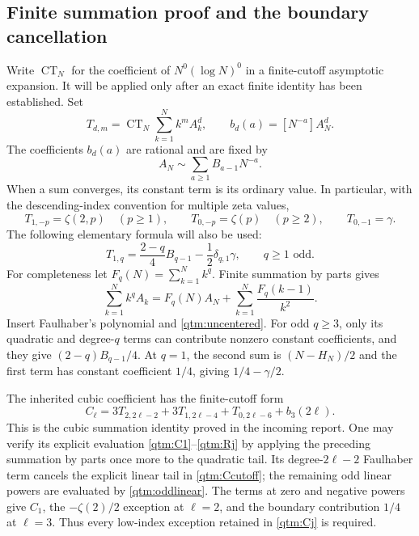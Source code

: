 \documentclass[11pt,a4paper]{article}
\numberwithin{equation}{section}
\theoremstyle{plain}
\theoremstyle{definition}
\theoremstyle{remark}
\begin{document}
\subsection{Finite summation proof and the boundary cancellation}

Write $\operatorname{CT}_N$ for the coefficient of
$N^0(\log N)^0$ in a finite-cutoff asymptotic expansion.  It will be
applied only after an exact finite identity has been established.
Set
\begin{equation}\label{qtm:T}
 T_{d,m}=\operatorname{CT}_N\sum_{k=1}^Nk^m A_k^d,
 \qquad b_d(a)=[N^{-a}]A_N^d.
\end{equation}
The coefficients $b_d(a)$ are rational and are fixed by
\begin{equation}\label{qtm:uncentered}
 A_N\sim\sum_{a\ge1}B_{a-1}N^{-a}.
\end{equation}
When a sum converges, its constant term is its ordinary value.  In
particular, with the descending-index convention for multiple zeta values,
\begin{equation}\label{qtm:linearnegative}
 T_{1,-p}=\zeta(2,p)\quad(p\ge1),\qquad
 T_{0,-p}=\zeta(p)\quad(p\ge2),\qquad T_{0,-1}=\gamma.
\end{equation}
The following elementary formula will also be used:
\begin{equation}\label{qtm:oddlinear}
 T_{1,q}=\frac{2-q}{4}B_{q-1}-\frac12\delta_{q,1}\gamma,
 \qquad q\ge1\text{ odd}.
\end{equation}
For completeness let $F_q(N)=\sum_{k=1}^Nk^q$.  Finite summation by
parts gives
\[
 \sum_{k=1}^Nk^qA_k
   =F_q(N)A_N+\sum_{k=1}^N\frac{F_q(k-1)}{k^2}.
\]
Insert Faulhaber's polynomial and \eqref{qtm:uncentered}.  For odd
$q\ge3$, only its quadratic and degree-$q$ terms can contribute
nonzero constant coefficients, and they give $(2-q)B_{q-1}/4$.
At $q=1$, the second sum is $(N-H_N)/2$ and the first term has
constant coefficient $1/4$, giving $1/4-\gamma/2$.

The inherited cubic coefficient has the finite-cutoff form
\begin{equation}\label{qtm:Ccutoff}
 C_\ell=3T_{2,2\ell-2}+3T_{1,2\ell-4}
          +T_{0,2\ell-6}+b_3(2\ell).
\end{equation}
This is the cubic summation identity proved in the incoming report.
One may verify its explicit evaluation
\eqref{qtm:C1}--\eqref{qtm:Rj} by applying the preceding summation
by parts once more to the quadratic tail.  Its degree-$2\ell-2$
Faulhaber term cancels the explicit linear tail in
\eqref{qtm:Ccutoff}; the remaining odd linear powers are evaluated
by \eqref{qtm:oddlinear}.  The terms at zero and negative powers
give $C_1$, the $-\zeta(2)/2$ exception at $\ell=2$, and the
boundary contribution $1/4$ at $\ell=3$.  Thus every low-index
exception retained in \eqref{qtm:Cj} is required.
\end{document}
